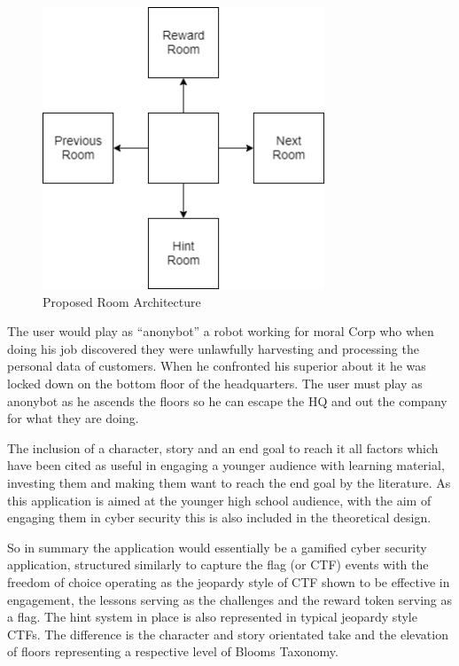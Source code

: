 \documentclass[12pt,a4paper]{article}
\begin{document}
\begin{figure}[h]
    \centering
    \includegraphics[width=0.75\textwidth]{Figs/roomarch.png} 
    \caption{Proposed Room Architecture} 
    \label{roomarch}
\end{figure}

The user would play as “anonybot” a robot working for moral Corp who when doing his job discovered they were unlawfully harvesting and processing the personal data of customers. When he confronted his superior about it he was locked down on the bottom floor of the headquarters. The user must play as anonybot as he ascends the floors so he can escape the HQ and out the company for what they are doing.

The inclusion of a character, story and an end goal to reach it all factors which have been cited as useful in engaging a younger audience with learning material, investing them and making them want to reach the end goal by the literature. As this application is aimed at the younger high school audience, with the aim of engaging them in cyber security this is also included in the theoretical design. 

So in summary the application would essentially be a gamified cyber security application, structured similarly to capture the flag (or CTF) events with the freedom of choice operating as the jeopardy style of CTF shown to be effective in engagement, the lessons serving as the challenges and the reward token serving as a flag. The hint system in place is also represented in typical jeopardy style CTFs. The difference is the character and story orientated take and the elevation of floors representing a respective level of Blooms Taxonomy. 
\end{document}
